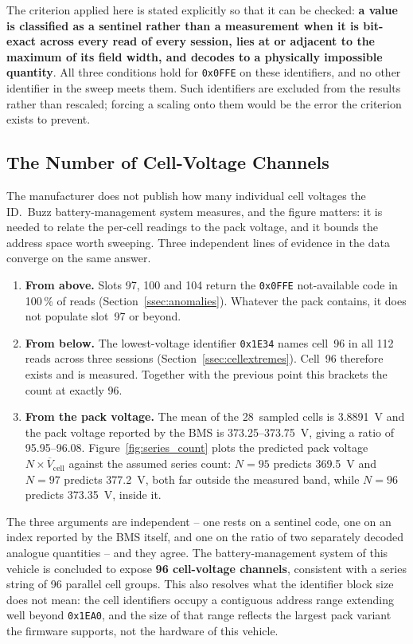 \documentclass[11pt,a4paper,oneside,parskip=half]{scrreprt}
\providecommand{\hex}{}\renewcommand{\hex}[1]{\texttt{0x#1}}
\begin{document}
The criterion applied here is stated explicitly so that it can be checked: \textbf{a value is classified as a sentinel rather than a measurement when it is bit-exact across every read of every session, lies at or adjacent to the maximum of its field width, and decodes to a physically impossible quantity}. All three conditions hold for \hex{0FFE} on these identifiers, and no other identifier in the sweep meets them. Such identifiers are excluded from the results rather than rescaled; forcing a scaling onto them would be the error the criterion exists to prevent.

\subsection{The Number of Cell-Voltage Channels}
\label{ssec:cellcount}
The manufacturer does not publish how many individual cell voltages the ID.~Buzz battery-management system measures, and the figure matters: it is needed to relate the per-cell readings to the pack voltage, and it bounds the address space worth sweeping. Three independent lines of evidence in the data converge on the same answer.

\begin{enumerate}
  \item \textbf{From above.} Slots 97, 100 and 104 return the \hex{0FFE} not-available code in 100\,\% of reads (Section~\ref{ssec:anomalies}). Whatever the pack contains, it does not populate slot~97 or beyond.
  \item \textbf{From below.} The lowest-voltage identifier \hex{1E34} names cell~96 in all 112 reads across three sessions (Section~\ref{ssec:cellextremes}). Cell~96 therefore exists and is measured. Together with the previous point this brackets the count at exactly 96.
  \item \textbf{From the pack voltage.} The mean of the 28~sampled cells is 3.8891~V and the pack voltage reported by the BMS is 373.25--373.75~V, giving a ratio of 95.95--96.08. Figure~\ref{fig:series_count} plots the predicted pack voltage $N\times\overline{V}_\mathrm{cell}$ against the assumed series count: $N=95$ predicts 369.5~V and $N=97$ predicts 377.2~V, both far outside the measured band, while $N=96$ predicts 373.35~V, inside it.
\end{enumerate}

\noindent The three arguments are independent -- one rests on a sentinel code, one on an index reported by the BMS itself, and one on the ratio of two separately decoded analogue quantities -- and they agree. The battery-management system of this vehicle is concluded to expose \textbf{96 cell-voltage channels}, consistent with a series string of 96 parallel cell groups. This also resolves what the identifier block size does not mean: the cell identifiers occupy a contiguous address range extending well beyond \hex{1EA0}, and the size of that range reflects the largest pack variant the firmware supports, not the hardware of this vehicle.
\end{document}
